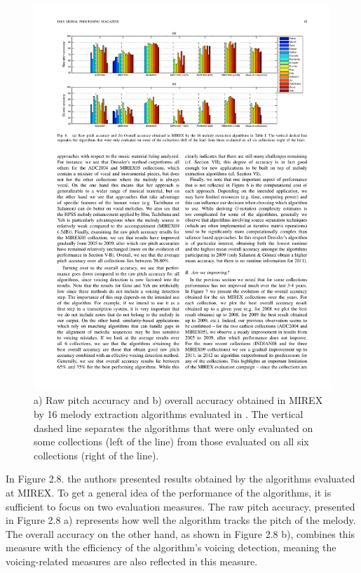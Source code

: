 \begin{figure}[h!]
  \centering
    \includegraphics[width=\textwidth]{Figures/comparisonall}
      \caption{a) Raw pitch accuracy and b) overall accuracy obtained in MIREX by 16 melody extraction algorithms evaluated in \cite{comparison}. The vertical dashed line separates the algorithms that were only evaluated on some collections (left of the line) from those evaluated on all six collections (right of the line)\cite{comparison}.}
\end{figure}


In Figure 2.8. the authors presented results obtained by the algorithms evaluated at MIREX. To get a general idea of the performance of the algorithms, it is sufficient to focus on two evaluation measures.
The raw pitch accuracy, presented in Figure 2.8 a) represents how well the algorithm tracks the pitch of the melody. The overall accuracy on the other hand, as shown in Figure 2.8 b), combines this measure with the efficiency of the algorithm's voicing detection, meaning the voicing-related measures are also reflected in this measure.

